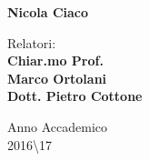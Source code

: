 \documentclass[12pt, oneside]{book}
\theoremstyle{definition}
\theoremstyle{plain}
\begin{document}
\begin{titlepage}
\begin{minipage}[t]{0.70\textwidth}
{\vspace{3mm}
\bf {Nicola Ciaco}}
\end{minipage}
\begin{minipage}[t]{0.47\textwidth}\raggedright
{\large Relatori:\\
\vspace{3mm}
\bf{Chiar.mo Prof.\\ Marco Ortolani\\
\vspace{5mm}
Dott. Pietro Cottone}}
\end{minipage}
\hfill
\vspace{20mm}
\begin{center}
{\large Anno Accademico\\2016\textbackslash17 }%
\end{center}
\end{titlepage}


\frontmatter %

\tableofcontents
\listoffigures
\listoftables










\end{document}
